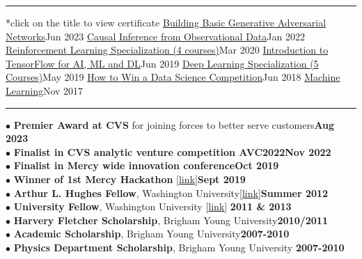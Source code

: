 \documentclass[10pt,letterpaper]{article}
\begin{document}
\vspace{-1ex}
\hrule
\vspace{1ex}
{*click on the title to view certificate}
\headedsubsection
{\href{https://www.coursera.org/account/accomplishments/certificate/BUL4BCDP55V6}{Building Basic Generative Adversarial Networks}}{Jun 2023}{}
\headedsubsection
{\href{https://www.coursera.org/account/accomplishments/certificate/VZHHWVMY9JFT}{Causal Inference from Observational Data}}{Jan 2022}{}
\headedsubsection
{\href{https://www.coursera.org/account/accomplishments/specialization/86SNN7EEXUL2}{Reinforcement Learning Specialization (4 courses)}}{Mar 2020}{}
\headedsubsection
{\href{https://www.coursera.org/account/accomplishments/certificate/KFLEJGRZMYQZ}{Introduction to TensorFlow for AI, ML and DL}}{Jun 2019}{}
\headedsubsection
{\href{https://www.coursera.org/account/accomplishments/specialization/P8F8U69WUCVD}{Deep Learning Specialization (5 Courses)}}{May 2019} {}
\headedsubsection
{\href{https://www.coursera.org/account/accomplishments/verify/WAQ4WS7BCBDS}{How to Win a Data Science Competition}}{Jun 2018}{}
\headedsubsection
{\href{https://www.coursera.org/account/accomplishments/certificate/R3Q26XAHTCHD}{Machine Learning}}{Nov 2017}{}

\hrule
\vspace{1ex}
$\bullet$ {\bf Premier Award at CVS} for joining forces to better serve customers\hfill{\bf Aug 2023}\\
$\bullet$ {\bf Finalist in CVS analytic venture competition  AVC2022}\hfill{\bf Nov 2022}\\
$\bullet$ {\bf Finalist in Mercy wide innovation conference}\hfill{\bf Oct 2019}\\
$\bullet$ {\bf Winner of 1st Mercy Hackathon} [\href {https://www.linkedin.com/feed/update/urn:li:activity:6582628165401792512/}{link}]\hfill{\bf Sept 2019}\\
 $\bullet$ {\bf Arthur L. Hughes Fellow}, Washington University[\href{https://physics.wustl.edu/graduate#secondary}{link}]\hfill {\bf Summer 2012}\\
 $\bullet$ {\bf University Fellow}, Washington University [\href{https://physics.wustl.edu/graduate#secondary}{link}] \hfill {\bf 2011 \& 2013 }\\
 $\bullet$ {\bf Harvery Fletcher Scholarship}, Brigham Young University\hfill {\bf 2010/2011}\\
 $\bullet$ {\bf Academic Scholarship}, Brigham Young University\hfill{\bf 2007-2010}\\
 $\bullet$ {\bf Physics Department Scholarship}, Brigham Young University \hfill{\bf 2007-2010}\\
\end{document}
